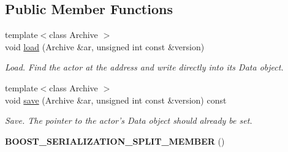 \subsection*{\-Public \-Member \-Functions}
\begin{DoxyCompactItemize}
\item 
{\footnotesize template$<$class Archive $>$ }\\void \hyperlink{structglutpp_1_1network_1_1actor_1_1update_1_1addr__raw_a4883db7c0b5227e0fcb124f786a121c1}{load} (\-Archive \&ar, unsigned int const \&version)
\begin{DoxyCompactList}\small\item\em \-Load. \-Find the actor at the address and write directly into its \-Data object. \end{DoxyCompactList}\item 
\hypertarget{structglutpp_1_1network_1_1actor_1_1update_1_1addr__raw_a52ecb325c7b91c90244d0d80a3f52ce0}{{\footnotesize template$<$class Archive $>$ }\\void \hyperlink{structglutpp_1_1network_1_1actor_1_1update_1_1addr__raw_a52ecb325c7b91c90244d0d80a3f52ce0}{save} (\-Archive \&ar, unsigned int const \&version) const }\label{structglutpp_1_1network_1_1actor_1_1update_1_1addr__raw_a52ecb325c7b91c90244d0d80a3f52ce0}

\begin{DoxyCompactList}\small\item\em \-Save. \-The pointer to the actor's \-Data object should already be set. \end{DoxyCompactList}\item 
\hypertarget{structglutpp_1_1network_1_1actor_1_1update_1_1addr__raw_acb8555614a3b629c3ce0523700b8ed39}{{\bfseries \-B\-O\-O\-S\-T\-\_\-\-S\-E\-R\-I\-A\-L\-I\-Z\-A\-T\-I\-O\-N\-\_\-\-S\-P\-L\-I\-T\-\_\-\-M\-E\-M\-B\-E\-R} ()}\label{structglutpp_1_1network_1_1actor_1_1update_1_1addr__raw_acb8555614a3b629c3ce0523700b8ed39}

\end{DoxyCompactItemize}
